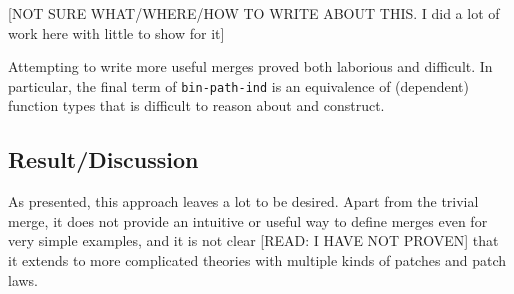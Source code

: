 [NOT SURE WHAT/WHERE/HOW TO WRITE ABOUT THIS. I did a lot of work here with little to
show for it]

Attempting to write more useful merges proved both laborious and difficult. In
particular, the final term of \texttt{bin-path-ind} is an equivalence of
(dependent) function types that is difficult to reason about and construct.

\subsection{Result/Discussion}

As presented, this approach leaves a lot to be desired. Apart from the trivial
merge, it does not provide an intuitive or useful way to define merges even for
very simple examples, and it is not clear [READ: I HAVE NOT PROVEN] that it
extends to more complicated theories with multiple kinds of patches and patch
laws.